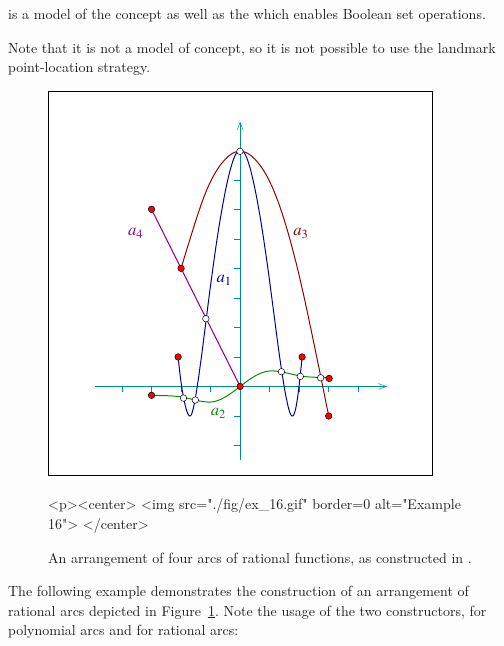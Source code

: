  is a model of the
 concept as well as the 
which enables Boolean set operations. 

Note that it is not a model of   concept,
so it is not possible to use the landmark point-location strategy.

\begin{figure}[h] 
\begin{ccTexOnly} 
  \begin{center}
  \includegraphics{Arrangement_on_surface_2/fig/ex_16}
  \end{center}
\end{ccTexOnly}
\begin{ccHtmlOnly}
  <p><center>
  <img src="./fig/ex_16.gif" border=0 alt="Example 16">
  </center>
\end{ccHtmlOnly}
\caption{An arrangement of four arcs of rational functions, as
constructed in .\label{arr_fig:ex_16}}
\end{figure}

The following example demonstrates the construction of an
arrangement of rational arcs depicted in
Figure~\ref{arr_fig:ex_16}. Note the usage of the two
constructors, for polynomial arcs and for rational arcs:

\pagebreak[3]


